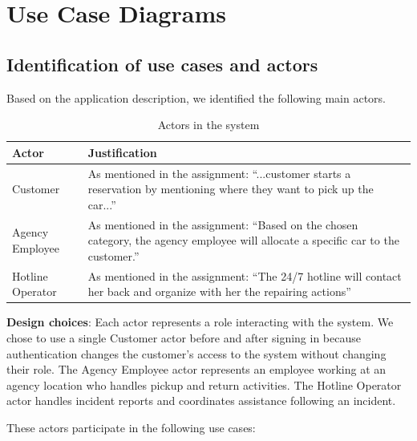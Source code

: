 \documentclass[12pt,a4paper]{report}
\begin{document}
\chapter{Use Case Diagrams}
\section{Identification of use cases and actors}
Based on the application description, we identified the following main actors.
\begin{table}[h]
    \centering
    \begin{tabularx}{\textwidth}{|l|X|}
        \hline
        \textbf{Actor} & \textbf{Justification} \\
        \hline
        Customer & As mentioned in the assignment: ``...customer starts a reservation by mentioning where they want to pick up the car...'' \\
        \hline
        Agency Employee & As mentioned in the assignment: ``Based on the
    chosen category, the agency employee will allocate a specific car to the customer.'' \\
        \hline
        Hotline Operator & As mentioned in the assignment: ``The 24/7 hotline will contact her back and organize with her the repairing actions'' \\
        \hline
    \end{tabularx}
    \caption{Actors in the system}
\end{table}

\textbf{Design choices}: Each actor represents a role interacting with the system.
We chose to use a single Customer actor before and after signing in because
authentication changes the customer's access to the system without changing
their role. The Agency Employee actor represents an employee working at an
agency location who handles pickup and return activities. The Hotline Operator
actor handles incident reports and coordinates assistance following an incident.

These actors participate in the following use cases:
\end{document}

